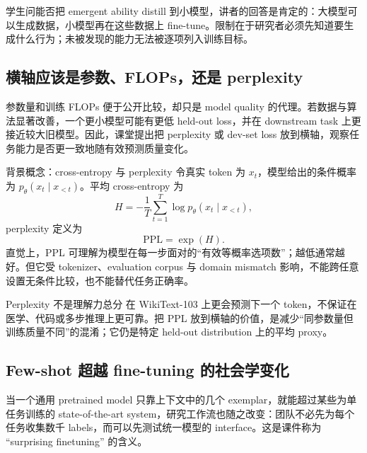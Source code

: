 学生问能否把 emergent ability distill 到小模型，讲者的回答是肯定的：大模型可以生成数据，小模型再在这些数据上 fine-tune。限制在于研究者必须先知道要生成什么行为；未被发现的能力无法被逐项列入训练目标。

\subsection{横轴应该是参数、FLOPs，还是 perplexity}

参数量和训练 FLOPs 便于公开比较，却只是 model quality 的代理。若数据与算法显著改善，一个更小模型可能有更低 held-out loss，并在 downstream task 上更接近较大旧模型。因此，课堂提出把 perplexity 或 dev-set loss 放到横轴，观察任务能力是否更一致地随有效预测质量变化。


\begin{knowledgebox}{背景概念：cross-entropy 与 perplexity}
令真实 token 为 $x_t$，模型给出的条件概率为 $p_\theta(x_t\mid x_{<t})$。平均 cross-entropy 为
\[
H=-\frac{1}{T}\sum_{t=1}^{T}\log p_\theta(x_t\mid x_{<t}),
\]
perplexity 定义为
\[
\mathrm{PPL}=\exp(H).
\]
直觉上，PPL 可理解为模型在每一步面对的“有效等概率选项数”；越低通常越好。但它受 tokenizer、evaluation corpus 与 domain mismatch 影响，不能跨任意设置无条件比较，也不能替代任务正确率。
\end{knowledgebox}

\begin{warningbox}{Perplexity 不是理解力总分}
在 WikiText-103 上更会预测下一个 token，不保证在医学、代码或多步推理上更可靠。把 PPL 放到横轴的价值，是减少“同参数量但训练质量不同”的混淆；它仍是特定 held-out distribution 上的平均 proxy。
\end{warningbox}


\subsection{Few-shot 超越 fine-tuning 的社会学变化}

当一个通用 pretrained model 只靠上下文中的几个 exemplar，就能超过某些为单任务训练的 state-of-the-art system，研究工作流也随之改变：团队不必先为每个任务收集数千 labels，而可以先测试统一模型的 interface。这是课件称为 ``surprising finetuning'' 的含义。

